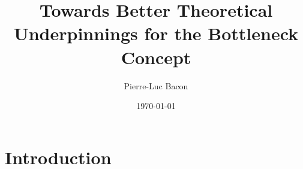 \documentclass[12pt, oneside, extrafontsizes]{memoir}  %
\theoremstyle{plain}
\theoremstyle{definition}
\begin{document}

\pretitle{\begin{center}\cftchapterfont\huge}
\posttitle{\end{center}}
\preauthor{\begin{center}\huge}
\postauthor{\end{center}}
\predate{\begin{center}\large}
\postdate{\end{center}}

\title{Towards Better Theoretical Underpinnings for the Bottleneck Concept}
\author{Pierre-Luc Bacon}
\date{\today}
\renewcommand\maketitlehookb{
\vfill
}
\renewcommand\maketitlehookc{
\vfill
\begin{center}
{
\large
Computer Science\\
McGill University, Montreal
}
\end{center}
\vspace{10mm}
}
\renewcommand\maketitlehookd{
\vspace{10mm}
A thesis submitted to McGill University in partial fulfilment of the requirements of
the degree of Master of Science.
\copyright Pierre-Luc Bacon; \today.
}

\begin{titlingpage}
\maketitle
\end{titlingpage}

\setcounter{tocdepth}{2}
\tableofcontents

\chapter{Introduction}
\end{document}
